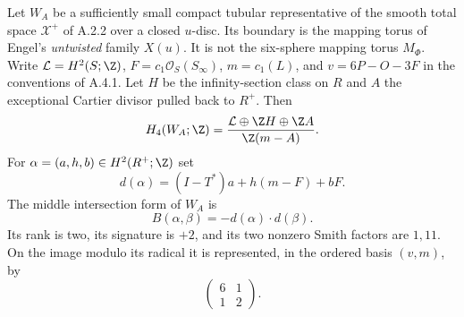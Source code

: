 \begin{proposition}
Let $W_A$ be a sufficiently small compact tubular representative of the
smooth total space $\mathcal X^+$ of A.2.2 over a closed $u$-disc.
Its boundary is the mapping torus of Engel's \emph{untwisted} family
$X(u)$. It is not the six-sphere mapping torus $M_\Phi$.
Write $\mathcal L=H^2(S;\Z)$, $F=c_1\mathcal O_S(S_\infty)$,
$m=c_1(L)$, and $v=6P-O-3F$ in the conventions of A.4.1.
Let $H$ be the infinity-section class on $R$ and $A$ the exceptional
Cartier divisor pulled back to $R^+$. Then
\[
 H_4(W_A;\Z)=
 \frac{\mathcal L\oplus\Z H\oplus\Z A}{\Z(m-A)}.
\]
For $\alpha=(a,h,b)\in H^2(R^+;\Z)$ set
\[
 d(\alpha)=(I-T^*)a+h(m-F)+bF.
\]
The middle intersection form of $W_A$ is
\[
 B(\alpha,\beta)=-d(\alpha)\cdot d(\beta).
\]
Its rank is two, its signature is $+2$, and its two nonzero Smith
factors are $1,11$. On the image modulo its radical it is represented,
in the ordered basis $(v,m)$, by
\[
 \begin{pmatrix}6&1\\1&2\end{pmatrix}.
\]
\end{proposition}
